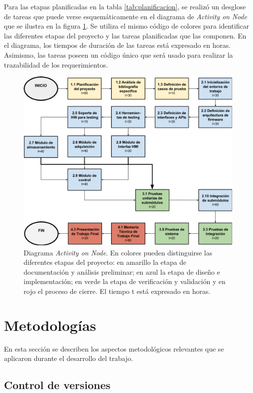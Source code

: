 Para las etapas planificadas en la tabla \ref{tab:planificacion}, se realizó un desglose de tareas que puede verse esquemáticamente en el diagrama de \textit{Activity on Node} que se ilustra en la figura \ref{fig:AoN}.  Se utiliza el mismo código de colores para identificar las diferentes etapas del proyecto y las tareas planificadas que las componen. En el diagrama, los tiempos de duración de las tareas está expresado en horas. Asimismo, las tareas poseen un código único que será usado para realizar la trazabilidad de los requerimientos.

\begin{figure}[h]
	\centering
	\includegraphics[width=\textwidth]{./Figures/AoN.pdf}
	\caption[Diagrama \textit{Activity on Node}.]{Diagrama \textit{Activity on Node}.  En colores pueden distinguirse las diferentes etapas del proyecto: en amarillo la etapa de documentación y análisis preliminar; en azul la etapa de diseño e implementación; en verde la etapa de verificación y validación y en rojo el proceso de cierre. El tiempo t está expresado en horas.}
	\label{fig:AoN}
\end{figure}

\clearpage
\section{Metodologías}

En esta sección se describen los aspectos metodológicos relevantes que se aplicaron durante el desarrollo del trabajo.  

\subsection{Control de versiones}
\label{subsec:branching}

